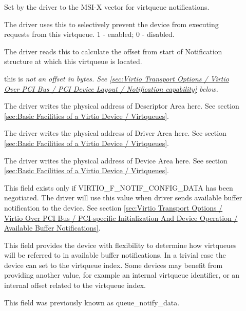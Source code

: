 \begin{description}
\item[]
        Set by the driver to the MSI-X vector for virtqueue notifications.

\item[]
        The driver uses this to selectively prevent the device from executing requests from this virtqueue.
        1 - enabled; 0 - disabled.

\item[]
        The driver reads this to calculate the offset from start of Notification structure at
        which this virtqueue is located.
        \begin{note} this is \em{not} an offset in bytes.
        See \ref{sec:Virtio Transport Options / Virtio Over PCI Bus / PCI Device Layout / Notification capability} below.
        \end{note}

\item[]
        The driver writes the physical address of Descriptor Area here.  See section \ref{sec:Basic Facilities of a Virtio Device / Virtqueues}.

\item[]
        The driver writes the physical address of Driver Area here.  See section \ref{sec:Basic Facilities of a Virtio Device / Virtqueues}.

\item[]
        The driver writes the physical address of Device Area here.  See section \ref{sec:Basic Facilities of a Virtio Device / Virtqueues}.

\item[]
        This field exists only if VIRTIO_F_NOTIF_CONFIG_DATA has been negotiated.
        The driver will use this value when driver sends available buffer
        notification to the device.
        See section \ref{sec:Virtio Transport Options / Virtio Over PCI Bus / PCI-specific Initialization And Device Operation / Available Buffer Notifications}.
        \begin{note}
        This field provides the device with flexibility to determine how virtqueues
        will be referred to in available buffer notifications.
        In a trivial case the device can set  to
        the virtqueue index. Some devices may benefit from providing another value,
        for example an internal virtqueue identifier, or an internal offset
        related to the virtqueue index.
        \end{note}
        \begin{note}
        This field was previously known as queue_notify_data.
        \end{note}


\end{description}
